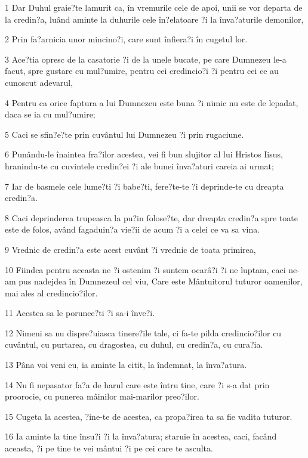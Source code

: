 \par 1 Dar Duhul graie?te lamurit ca, în vremurile cele de apoi, unii se vor departa de la credin?a, luând aminte la duhurile cele în?elatoare ?i la înva?aturile demonilor,
\par 2 Prin fa?arnicia unor mincino?i, care sunt înfiera?i în cugetul lor.
\par 3 Ace?tia opresc de la casatorie ?i de la unele bucate, pe care Dumnezeu le-a facut, spre gustare cu mul?umire, pentru cei credincio?i ?i pentru cei ce au cunoscut adevarul,
\par 4 Pentru ca orice faptura a lui Dumnezeu este buna ?i nimic nu este de lepadat, daca se ia cu mul?umire;
\par 5 Caci se sfin?e?te prin cuvântul lui Dumnezeu ?i prin rugaciune.
\par 6 Punându-le înaintea fra?ilor acestea, vei fi bun slujitor al lui Hristos Iisus, hranindu-te cu cuvintele credin?ei ?i ale bunei înva?aturi careia ai urmat;
\par 7 Iar de basmele cele lume?ti ?i babe?ti, fere?te-te ?i deprinde-te cu dreapta credin?a.
\par 8 Caci deprinderea trupeasca la pu?in folose?te, dar dreapta credin?a spre toate este de folos, având fagaduin?a vie?ii de acum ?i a celei ce va sa vina.
\par 9 Vrednic de credin?a este acest cuvânt ?i vrednic de toata primirea,
\par 10 Fiindca pentru aceasta ne ?i ostenim ?i suntem ocarâ?i ?i ne luptam, caci ne-am pus nadejdea în Dumnezeul cel viu, Care este Mântuitorul tuturor oamenilor, mai ales al credincio?ilor.
\par 11 Acestea sa le porunce?ti ?i sa-i înve?i.
\par 12 Nimeni sa nu dispre?uiasca tinere?ile tale, ci fa-te pilda credincio?ilor cu cuvântul, cu purtarea, cu dragostea, cu duhul, cu credin?a, cu cura?ia.
\par 13 Pâna voi veni eu, ia aminte la citit, la îndemnat, la înva?atura.
\par 14 Nu fi nepasator fa?a de harul care este întru tine, care ?i s-a dat prin proorocie, cu punerea mâinilor mai-marilor preo?ilor.
\par 15 Cugeta la acestea, ?ine-te de acestea, ca propa?irea ta sa fie vadita tuturor.
\par 16 Ia aminte la tine însu?i ?i la înva?atura; staruie în acestea, caci, facând aceasta, ?i pe tine te vei mântui ?i pe cei care te asculta.

